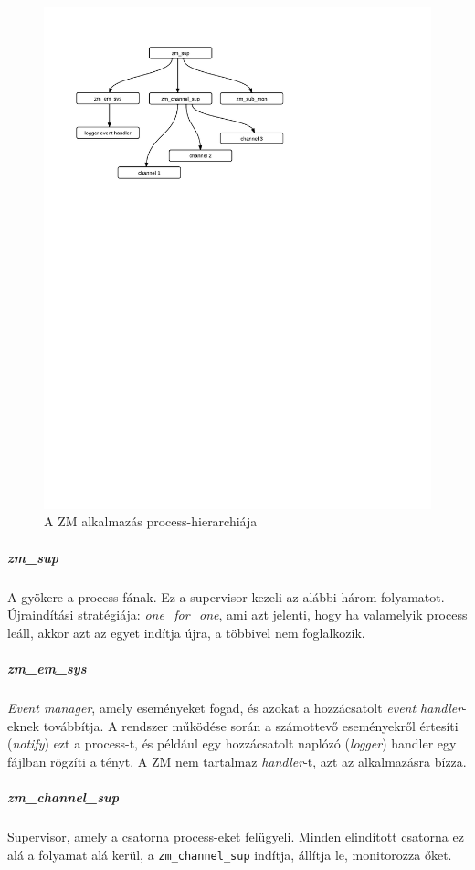 \documentclass[12pt, a4paper, oneside]{book}
\begin{document}
\begin{figure}
\caption{A ZM alkalmazás process-hierarchiája}
\includegraphics[clip=true, trim= 0 18cm 0 1cm]{fig/ZmSup.pdf}
\end{figure}

\subparagraph{zm\_sup} A gyökere a process-fának. Ez a supervisor kezeli az
alábbi három folyamatot. Újraindítási stratégiája: \emph{one\_for\_one}, ami
azt jelenti, hogy ha valamelyik process leáll, akkor azt az egyet indítja újra,
a többivel nem foglalkozik.

\subparagraph{zm\_em\_sys} \emph{Event manager}, amely eseményeket fogad,
és azokat a hozzácsatolt \emph{event handler}-eknek továbbítja. A rendszer
működése során a számottevő eseményekről értesíti (\emph{notify}) ezt a
process-t, és például egy hozzácsatolt naplózó (\emph{logger}) handler egy
fájlban rögzíti a tényt. A ZM nem tartalmaz \emph{handler}-t, azt az
alkalmazásra bízza.

\subparagraph{zm\_channel\_sup} Supervisor, amely a csatorna process-eket
felügyeli. Minden elindított csatorna ez alá a folyamat alá kerül, a
\texttt{zm\_channel\_sup} indítja, állítja le, monitorozza őket.
\end{document}
